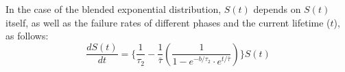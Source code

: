 In the case of the blended exponential distribution, $S(t)$ depends on $S(t)$ itself, as well as the failure rates of different phases and the current lifetime ($t$), as follows:
\begin{equation}
  \label{eq:ramanujan}
  \dfrac{dS(t)}{dt} = \{\dfrac{1}{\tau_2} - \dfrac{1}{\bar{\tau}}(\dfrac{1}{1-e^{-b/\tau_2} \cdot e^{t/\bar{\tau}}}) \}S(t)
\end{equation}























